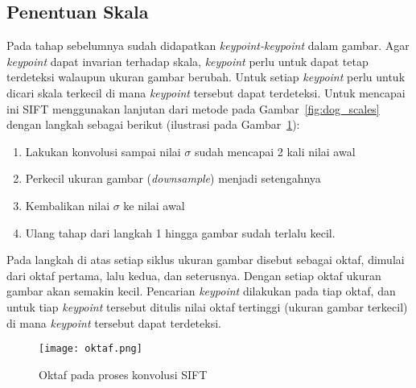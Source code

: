 \subsection{Penentuan Skala}
Pada tahap sebelumnya sudah didapatkan \textit{keypoint-keypoint} dalam gambar. Agar \textit{keypoint} dapat invarian terhadap skala, \textit{keypoint} perlu untuk dapat tetap terdeteksi walaupun ukuran gambar berubah. Untuk setiap \textit{keypoint} perlu untuk dicari skala terkecil di mana \textit{keypoint} tersebut dapat terdeteksi. Untuk mencapai ini SIFT menggunakan lanjutan dari metode pada Gambar~\ref{fig:dog_scales} dengan langkah sebagai berikut (ilustrasi pada Gambar~\ref{fig:oktaf}):
\begin{enumerate}
	\item Lakukan konvolusi sampai nilai $\sigma$ sudah mencapai 2 kali nilai awal
	\item Perkecil ukuran gambar (\textit{downsample}) menjadi setengahnya
	\item Kembalikan nilai $\sigma$ ke nilai awal
	\item Ulang tahap dari langkah 1 hingga gambar sudah terlalu kecil.
\end{enumerate}

Pada langkah di atas setiap siklus ukuran gambar disebut sebagai oktaf, dimulai dari oktaf pertama, lalu kedua, dan seterusnya. Dengan setiap oktaf ukuran gambar akan semakin kecil. Pencarian \textit{keypoint} dilakukan pada tiap oktaf, dan untuk tiap \textit{keypoint} tersebut ditulis nilai oktaf tertinggi (ukuran gambar terkecil) di mana \textit{keypoint} tersebut dapat terdeteksi.

\begin{comment}
Saat nilai $\sigma$ sudah mencapai 2 kali dari nilai awalnya---atau yang disebut sudah menyelesaikan satu oktaf---maka proses akan dilanjutkan ke oktaf berikutnya, gambar akan diperkecil (\textit{downsample}) ukuran menjadi setengahnya dan proses konvolusi diulang lagi (Gambar~\ref{fig:oktaf}). Untuk oktaf baru tersebut akan dihitung DoG-nya dan dicari \textit{extrema}-nya. Untuk setiap \textit{keypoint} akan dicatat oktaf terbesar (ukuran gambar terkecil) di mana gambar \textit{keypoint} tersebut tetap ditemukan. 
\end{comment}

\begin{figure}[H]
	\centering
	\texttt{[image: oktaf.png]}
	\caption{Oktaf pada proses konvolusi SIFT}
	\label{fig:oktaf}
\end{figure}

